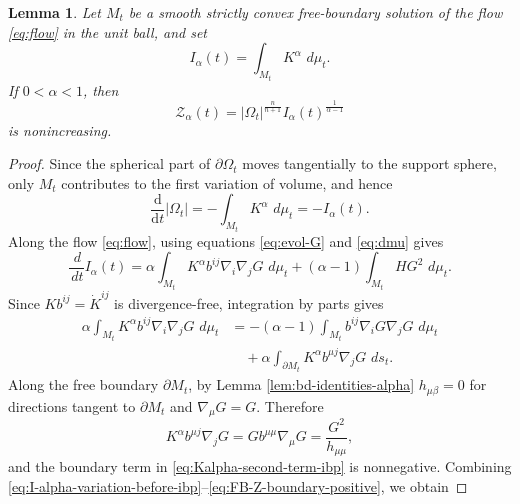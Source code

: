 \documentclass[11pt, reqno]{amsart}
\newtheorem{lemma}[theorem]{Lemma}
\theoremstyle{remark}
\theoremstyle{definition}
\numberwithin{equation}{section}
\newcommand{\dd}{\,d}
\begin{document}
\begin{lemma}	\label{prop:FB-Z-monotonicity}
	Let $M_t$ be a smooth strictly convex free-boundary solution of
	the flow \eqref{eq:flow} in the unit ball, and set
	\begin{equation*}
		I_\alpha(t)=\int_{M_t}K^\alpha\,\dd \mu_t .
	\end{equation*}
	If $0<\alpha<1$, then
	\begin{equation}\label{s5.And}
		\mathcal Z_\alpha(t)
		=|\Omega_t|^{\frac n{n+1}}I_\alpha(t)^{\frac1{\alpha-1}}
	\end{equation}
	is nonincreasing.
\end{lemma}

\begin{proof}
	Since the spherical part of $\partial\Omega_t$ moves tangentially to the support sphere, only $M_t$ contributes to the first variation of volume, and hence
	\begin{equation}\label{eq:FB-volume-variation-subunit}
		\dfrac{\mathrm{d}}{\mathrm{d}t}|\Omega_t|=-\int_{M_t} K^\alpha \,\dd \mu_t=-I_\alpha(t).
	\end{equation}
	Along the flow \eqref{eq:flow}, using equations \eqref{eq:evol-G} and \eqref{eq:dmu} gives
	\begin{equation}\label{eq:I-alpha-variation-before-ibp}
		\frac{\dd}{\dd t}I_\alpha(t)
		=\alpha\int_{M_t}K^\alpha b^{ij}\nabla_i\nabla_j G\,\dd \mu_t
		+(\alpha-1)\int_{M_t}H G^2\,\dd \mu_t .
	\end{equation}
	Since $K b^{ij}=\dot{K}^{ij}$ is divergence-free, integration by parts gives
	\begin{equation}\label{eq:Kalpha-second-term-ibp}
		\begin{split}
			\alpha\int_{M_t} K^\alpha b^{ij}\nabla_i\nabla_j G\,\dd \mu_t
			&=-(\alpha-1)\int_{M_t} b^{ij}\nabla_i G\nabla_j G\,\dd \mu_t  \\
			&\quad +\alpha\int_{\partial M_t}K^\alpha b^{\mu j}\nabla_j G\,\dd s_t.
		\end{split}
	\end{equation}
	Along the free boundary $\partial M_t$, by Lemma \ref{lem:bd-identities-alpha}   $h_{\mu\beta}=0$ for directions tangent to $\partial M_t$ and $\nabla_\mu G=G$.  Therefore
	\begin{equation}\label{eq:FB-Z-boundary-positive}
		K^\alpha b^{\mu j}\nabla_j G
		=G b^{\mu\mu}\nabla_\mu G
		=\frac{G^2}{h_{\mu\mu}},
	\end{equation}
	and the boundary term in \eqref{eq:Kalpha-second-term-ibp} is nonnegative.  Combining \eqref{eq:I-alpha-variation-before-ibp}--\eqref{eq:FB-Z-boundary-positive}, 	we obtain 

\end{proof}
\end{document}
